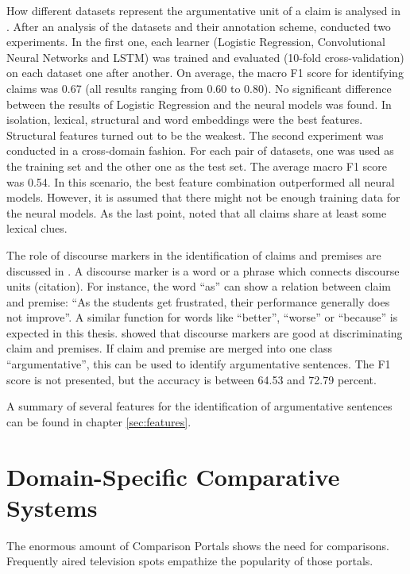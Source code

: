 How different datasets represent the argumentative unit of a claim is analysed in \cite{Daxenberger2017What-is-the-Ess}. After an analysis of the datasets and their annotation scheme, \cite{Daxenberger2017What-is-the-Ess} conducted two experiments.
In the first one, each learner (Logistic Regression, Convolutional Neural Networks and LSTM) was trained and evaluated (10-fold cross-validation) on each dataset one after another. On average, the macro F1 score for identifying claims was 0.67 (all results ranging from 0.60 to 0.80). No significant difference between the results of Logistic Regression and the neural models was found. In isolation, lexical, structural and word embeddings were the best features. Structural features turned out to be the weakest.
The second experiment was conducted in a cross-domain fashion. For each pair of datasets, one was used as the training set and the other one as the test set. The average macro F1 score was 0.54. In this scenario, the best feature combination outperformed all neural models. However, it is assumed that there might not be enough training data for the neural models.
As the last point, \cite{Daxenberger2017What-is-the-Ess} noted that all claims share at least some lexical clues.


The role of discourse markers in the identification of claims and premises are discussed in \cite{Eckle-Kohler2015On-the-Role-of-}. A discourse marker is a word or a phrase which connects discourse units (citation). For instance, the word \enquote{as} can show a relation between claim and premise: \enquote{As the students get frustrated, their performance generally does not improve}.  A similar function for words like \enquote{better}, \enquote{worse} or \enquote{because} is expected in this thesis. \cite{Eckle-Kohler2015On-the-Role-of-} showed that discourse markers are good at discriminating claim and premises. If claim and premise are merged into one class \enquote{argumentative}, this can be used to identify argumentative sentences. The F1 score is not presented, but the accuracy is between 64.53 and 72.79 percent.

A summary of several features for the identification of argumentative sentences can be found in chapter \ref{sec:features}.





\section{Domain-Specific Comparative Systems}
The enormous amount of Comparison Portals shows the need for comparisons. Frequently aired television spots empathize the popularity of those portals.

